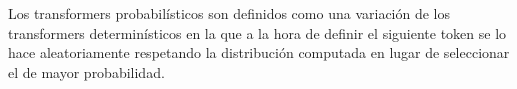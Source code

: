Los transformers probabilísticos son definidos como una variación de los transformers determinísticos en la que a la hora de definir el siguiente token se lo hace aleatoriamente respetando la distribución computada en lugar de seleccionar el de mayor probabilidad.





